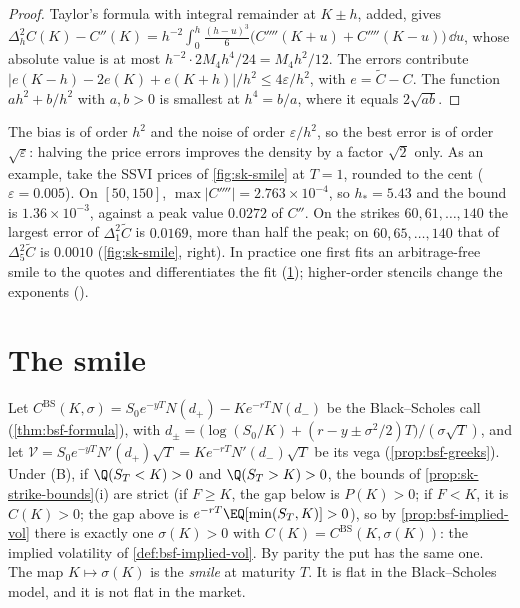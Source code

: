 \begin{proof}
Taylor's formula with integral remainder at $K\pm h$, added, gives
$\Delta_h^2C(K)-C''(K)=h^{-2}\int_0^h\frac{(h-u)^3}{6}\big(C''''(K+u)+C''''(K-u)\big)\,\dd u$, whose absolute
value is at most $h^{-2}\cdot2M_4h^4/24=M_4h^2/12$. The errors contribute
$|e(K-h)-2e(K)+e(K+h)|/h^2\le4\varepsilon/h^2$, with $e=\tilde C-C$. The function $ah^2+b/h^2$ with
$a,b>0$ is smallest at $h^4=b/a$, where it equals $2\sqrt{ab}$.
\end{proof}

The bias is of order $h^2$ and the noise of order $\varepsilon/h^2$, so the best error is of order
$\sqrt\varepsilon$: halving the price errors improves the density by a factor $\sqrt2$ only. As an
example, take the SSVI prices of \cref{fig:sk-smile} at $T=1$, rounded to the cent
($\varepsilon=0.005$). On $[50,150]$, $\max|C''''|=2.763\times10^{-4}$, so $h_*=5.43$ and the bound is
$1.36\times10^{-3}$, against a peak value $0.0272$ of $C''$. On the strikes $60,61,\dots,140$ the largest
error of $\Delta_1^2\tilde C$ is $0.0169$, more than half the peak; on $60,65,\dots,140$ that of
$\Delta_5^2\tilde C$ is $0.0010$ (\cref{fig:sk-smile}, right). In practice one first fits an
arbitrage-free smile to the quotes and differentiates the fit (\cref{sec:sk-smile}); higher-order
stencils change the exponents ().

\section{The smile}\label{sec:sk-smile}

Let $C^{\mathrm{BS}}(K,\sigma)=S_0e^{-yT}N(d_+)-Ke^{-rT}N(d_-)$ be the Black--Scholes call
(\cref{thm:bsf-formula}), with $d_\pm=\big(\log(S_0/K)+(r-y\pm\sigma^2/2)T\big)/(\sigma\sqrt T)$, and let
$\mathcal V=S_0e^{-yT}N'(d_+)\sqrt T=Ke^{-rT}N'(d_-)\sqrt T$ be its vega (\cref{prop:bsf-greeks}). Under (B),
if $\Q(S_T<K)>0$ and $\Q(S_T>K)>0$, the bounds of \cref{prop:sk-strike-bounds}(i) are strict (if
$F\ge K$, the gap below is $P(K)>0$; if $F<K$, it is $C(K)>0$; the gap above is
$e^{-rT}\EQ[\min(S_T,K)]>0$), so by \cref{prop:bsf-implied-vol} there is exactly one $\sigma(K)>0$ with
$C(K)=C^{\mathrm{BS}}(K,\sigma(K))$: the implied volatility of \cref{def:bsf-implied-vol}. By parity the put
has the same one. The map $K\mapsto\sigma(K)$ is the \emph{smile} at maturity $T$. It is flat in the
Black--Scholes model, and it is not flat in the market.

